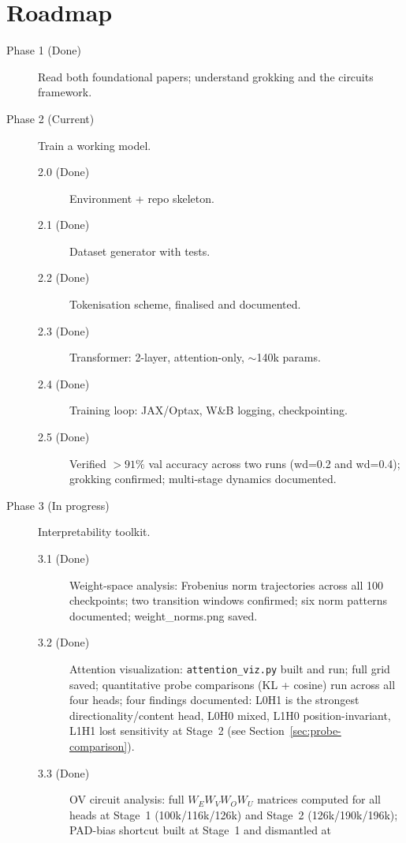 \documentclass[11pt, a4paper]{article}
\begin{document}
\section{Roadmap}
\label{sec:roadmap}

\begin{description}
  \item[Phase 1 (Done)] Read both foundational papers; understand grokking and
    the circuits framework.
  \item[Phase 2 (Current)] Train a working model.
    \begin{description}
      \item[2.0 (Done)] Environment + repo skeleton.
      \item[2.1 (Done)] Dataset generator with tests.
      \item[2.2 (Done)] Tokenisation scheme, finalised and documented.
      \item[2.3 (Done)] Transformer: 2-layer, attention-only, $\sim$140k params.
      \item[2.4 (Done)] Training loop: JAX/Optax, W\&B logging, checkpointing.
      \item[2.5 (Done)] Verified $>91\%$ val accuracy across two runs (wd=0.2 and wd=0.4);
        grokking confirmed; multi-stage dynamics documented.
    \end{description}
  \item[Phase 3 (In progress)] Interpretability toolkit.
    \begin{description}
      \item[3.1 (Done)] Weight-space analysis: Frobenius norm trajectories across
        all 100 checkpoints; two transition windows confirmed; six norm patterns
        documented; weight\_norms.png saved.
      \item[3.2 (Done)] Attention visualization: \texttt{attention\_viz.py} built
        and run; full grid saved; quantitative probe comparisons (KL + cosine)
        run across all four heads; four findings documented: L0H1 is the
        strongest directionality/content head, L0H0 mixed, L1H0
        position-invariant, L1H1 lost sensitivity at Stage~2
        (see Section~\ref{sec:probe-comparison}).
      \item[3.3 (Done)] OV circuit analysis: full $W_E W_V W_O W_U$ matrices
        computed for all heads at Stage~1 (100k/116k/126k) and Stage~2
        (126k/190k/196k); PAD-bias shortcut built at Stage~1 and dismantled at

\end{description}
\end{description}
\end{document}
